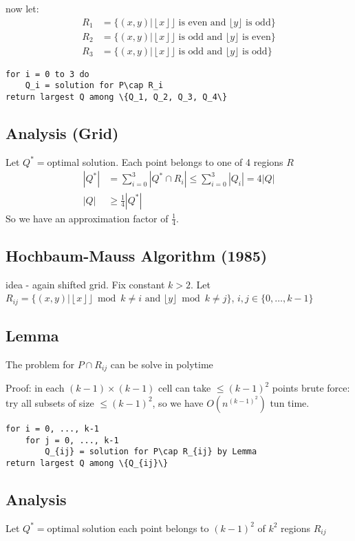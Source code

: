 \documentclass[english,12pt]{article}
\theoremstyle{plain}
\theoremstyle{definition}
\theoremstyle{definition} %
\newcommand{\floor}[1]{\left\lfloor #1 \right\rfloor}
\begin{document}
now let:
\begin{align*}
R_1&=\{(x, y)|\floor x\rfloor \text{ is even and }\lfloor y\rfloor \text{ is odd}\}\\
R_2&=\{(x, y)|\floor x\rfloor \text{ is odd and }\lfloor y\rfloor \text{ is even}\}\\
R_3&=\{(x, y)|\floor x\rfloor \text{ is odd and }\lfloor y\rfloor \text{ is odd}\}
\end{align*}

\begin{verbatim}
for i = 0 to 3 do
    Q_i = solution for P\cap R_i
return largest Q among \{Q_1, Q_2, Q_3, Q_4\}
\end{verbatim}

\subsection{Analysis (Grid)}
Let $Q^\ast=$optimal solution.  Each point belongs to one of 4 regions $R$
\begin{align*}
|Q^\ast| &= \sum_{i=0}^3|Q^\ast\cap R_i|
\le \sum_{i=0}^3|Q_i|=4|Q|\\
|Q|&\ge\frac{1}{4}|Q^\ast|
\end{align*}
So we have an approximation factor of $\frac{1}{4}$.

\subsection{Hochbaum-Mauss Algorithm (1985)}
idea - again shifted grid.  Fix constant $k>2$.  Let $R_{ij}=\{(x, y)|\floor x\rfloor\bmod k \ne i\text{ and }\lfloor y\rfloor\bmod k\ne j\}$, $i,j\in\{0,\ldots, k-1\}$

\subsection{Lemma}
The problem for $P\cap R_{ij}$ can be solve in polytime

Proof: in each $(k-1)\times(k-1)$ cell can take $\le (k-1)^2$ points
brute force: try all subsets of size $\le (k-1)^2$, so we have $O(n^{(k-1)^2})$ tun time.

\begin{verbatim}
for i = 0, ..., k-1
    for j = 0, ..., k-1
        Q_{ij} = solution for P\cap R_{ij} by Lemma
return largest Q among \{Q_{ij}\}
\end{verbatim}

\subsection{Analysis}
Let $Q^\ast=$optimal solution each point belongs to $(k-1)^2$ of $k^2$ regions $R_{ij}$
\end{document}
